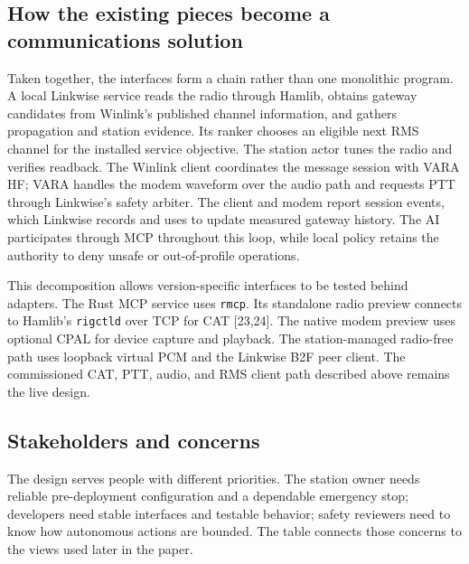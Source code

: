 \documentclass[11pt,a4paper]{article}
\begin{document}
\subsection{How the existing pieces become a communications solution}
Taken together, the interfaces form a chain rather than one monolithic
program. A local Linkwise service reads the radio through Hamlib, obtains
gateway candidates from Winlink's published channel information, and gathers
propagation and station evidence. Its ranker chooses an eligible next RMS
channel for the installed service objective. The station actor tunes the
radio and verifies readback. The Winlink client coordinates the message
session with VARA HF; VARA handles the modem waveform over the audio path and
requests PTT through Linkwise's safety arbiter. The client and modem report
session events, which Linkwise records and uses to update measured gateway
history. The AI participates through MCP throughout this loop, while local
policy retains the authority to deny unsafe or out-of-profile operations.

This decomposition allows version-specific interfaces to be tested behind
adapters. The Rust MCP service uses \texttt{rmcp}. Its standalone radio
preview connects to Hamlib's \texttt{rigctld} over TCP for CAT [23,24].
The native modem preview uses optional CPAL for device capture and
playback. The station-managed radio-free path uses loopback virtual PCM
and the Linkwise B2F peer client. The commissioned CAT, PTT, audio, and
RMS client path described above remains the live design.

\subsection{Stakeholders and concerns}
The design serves people with different priorities. The station owner needs reliable pre-deployment configuration and a dependable emergency stop; developers need stable interfaces and testable behavior; safety reviewers need to know how autonomous actions are bounded. The table connects those concerns to the views used later in the paper.
\end{document}
